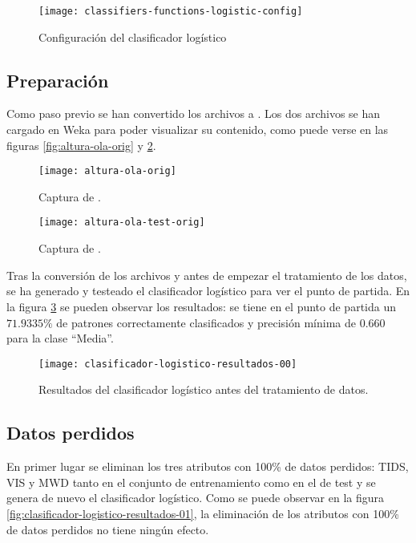 \begin{figure}[ht]
    \centering
    \texttt{[image: classifiers-functions-logistic-config]}
    \caption{Configuración del clasificador logístico}
    \label{fig:classifiers-functions-logistic-config}
\end{figure}

\subsection{Preparación}
Como paso previo se han convertido los archivos  a . Los dos archivos se han cargado en Weka para poder visualizar su contenido, como puede verse en las figuras \ref{fig:altura-ola-orig} y \ref{fig:altura-ola-test-orig}.

\begin{figure}[H]
    \centering
    \begin{minipage}{0.5\textwidth}
        \centering
        \texttt{[image: altura-ola-orig]}
        \caption{Captura de .}
        \label{fig:altura-ola-orig}
    \end{minipage}\hfill
    \begin{minipage}{0.5\textwidth}
        \centering
        \texttt{[image: altura-ola-test-orig]}
        \caption{Captura de .}
        \label{fig:altura-ola-test-orig}
    \end{minipage}
\end{figure}

Tras la conversión de los archivos y antes de empezar el tratamiento de los datos, se ha generado y testeado el clasificador logístico para ver el punto de partida. En la figura \ref{fig:clasificador-logistico-resultados-00} se pueden observar los resultados: se tiene en el punto de partida un $71.9335\%$ de patrones correctamente clasificados y precisión mínima de $0.660$ para la clase ``Media''.

\begin{figure}[ht]
    \centering
    \texttt{[image: clasificador-logistico-resultados-00]}
    \caption{Resultados del clasificador logístico antes del tratamiento de datos.}
    \label{fig:clasificador-logistico-resultados-00}
\end{figure}

\subsection{Datos perdidos}
En primer lugar se eliminan los tres atributos con 100\% de datos perdidos: TIDS, VIS y MWD tanto en el conjunto de entrenamiento como en el de test y se genera de nuevo el clasificador logístico. Como se puede observar en la figura \ref{fig:clasificador-logistico-resultados-01}, la eliminación de los atributos con 100\% de datos perdidos no tiene ningún efecto.

